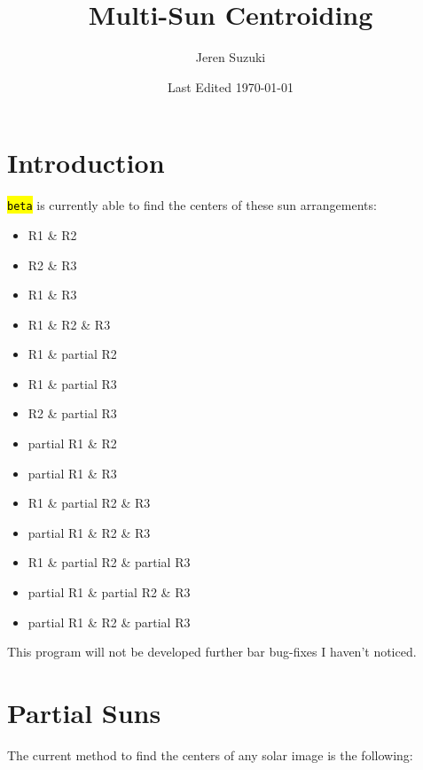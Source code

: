\documentclass[10pt]{scrartcl}
\title{Multi-Sun Centroiding}
\author{Jeren Suzuki}
\date{Last Edited \today}
\begin{document}
\maketitle
{}
\tableofcontents
\clearpage
{}

\section{Introduction} %
\label{sec:introduction}
\hl{\texttt{beta}} is currently able to find the centers of these sun arrangements:

\begin{itemize}
    \item R1 \& R2
    \item R2 \& R3
    \item R1 \& R3
    \item R1 \& R2 \& R3
    \item R1 \& partial R2
    \item R1 \& partial R3
    \item R2 \& partial R3
    \item partial R1 \& R2
    \item partial R1 \& R3
    \item R1 \& partial R2 \& R3
    \item partial R1 \& R2 \& R3
    \item R1 \& partial R2 \& partial R3
    \item partial R1 \& partial R2 \& R3
    \item partial R1 \& R2 \& partial R3
\end{itemize}

This program will not be developed further bar bug-fixes I haven't noticed. \\

\section{Partial Suns} %
\label{sec:partial_suns}

The current method to find the centers of any solar image is the following:
\end{document}
